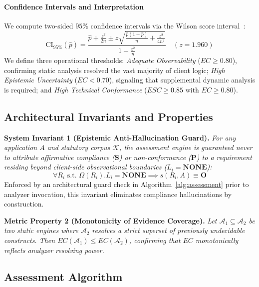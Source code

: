\paragraph{Confidence Intervals and Interpretation} We compute two-sided $95\%$ confidence intervals via the Wilson score interval~\cite{wilson_score_interval}:
\begin{equation}
\text{CI}_{95\%}(\hat{p}) = \frac{\hat{p} + \frac{z^2}{2n} \pm z \sqrt{\frac{\hat{p}(1-\hat{p})}{n} + \frac{z^2}{4n^2}}}{1 + \frac{z^2}{n}} \quad (z = 1.960)
\end{equation}
We define three operational thresholds: \textit{Adequate Observability} ($EC \ge 0.80$), confirming static analysis resolved the vast majority of client logic; \textit{High Epistemic Uncertainty} ($EC < 0.70$), signaling that supplemental dynamic analysis is required; and \textit{High Technical Conformance} ($ESC \ge 0.85$ with $EC \ge 0.80$).

\subsection{Architectural Invariants and Properties}
\label{sec:assessment:invariants}

\noindent\textbf{System Invariant 1 (Epistemic Anti-Hallucination Guard).}
\textit{For any application $A$ and statutory corpus $\mathcal{K}$, the assessment engine is guaranteed never to attribute affirmative compliance ($\mathbf{S}$) or non-conformance ($\mathbf{P}$) to a requirement residing beyond client-side observational boundaries ($L_i = \mathbf{NONE}$):
\begin{equation}
\forall R_i \text{ s.t. } \Omega(R_i).L_i = \mathbf{NONE} \implies s(R_i, A) \equiv \mathbf{O}
\end{equation}}
Enforced by an architectural guard check in Algorithm~\ref{alg:assessment} prior to analyzer invocation, this invariant eliminates compliance hallucinations by construction.

\noindent\textbf{Metric Property 2 (Monotonicity of Evidence Coverage).}
\textit{Let $\mathcal{A}_1 \subseteq \mathcal{A}_2$ be two static engines where $\mathcal{A}_2$ resolves a strict superset of previously undecidable constructs. Then $EC(\mathcal{A}_1) \le EC(\mathcal{A}_2)$, confirming that $EC$ monotonically reflects analyzer resolving power.}

\subsection{Assessment Algorithm}
\label{sec:assessment:algorithm}

